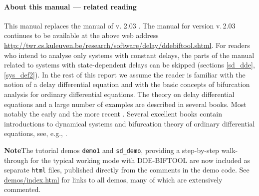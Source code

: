 \documentclass[10pt]{scrartcl}
\newcommand{\DDEBIFCODE}{\textsc{DDE-BIFTOOL}}
\newcommand{\ddebifweb}{\url{http://twr.cs.kuleuven.be/research/software/delay/ddebiftool.shtml}}
\newcommand{\demobase}{\url{demos/index.html}}
\begin{document}
\paragraph{About this manual --- related reading}
This manual replaces the manual of v. 2.03 \cite{ELS01}. The manual
for version v.\,2.03 continues to be available at the above web
address \ddebifweb{}.  For readers who intend to analyse only systems
with constant delays, the parts of the manual related to systems with
state-dependent delays can be skipped (sections \ref{sd_dde},
\ref{sys_def2}).  In the rest of this report we assume
the reader is familiar with the notion of a delay differential
equation and with the basic concepts of bifurcation analysis for
ordinary differential equations.  The theory on delay differential
equations and a large number of examples are described in several
books. Most notably the early
\cite{Bell63,El's73,Driv77,Hale77a,Kolm86} and the more recent
\cite{Azbe91,Kolm92,Hale93,Diek95,Kolm99}.  Several excellent books
contain introductions to dynamical systems and bifurcation theory of
ordinary differential equations, see, e.g.,
\cite{Chow82,Guck83,Argy94,Seyd94,Kuzn04}.

\textbf{\textsf{Note}}\quad The tutorial demos \texttt{demo1} and
\texttt{sd\_demo}, providing a step-by-step walk-through for the
typical working mode with \DDEBIFCODE{} are now included as separate
\texttt{html} files, published directly from the comments in the demo
code. See \demobase{} for links to all demos, many of which are
extensively commented.
\end{document}
